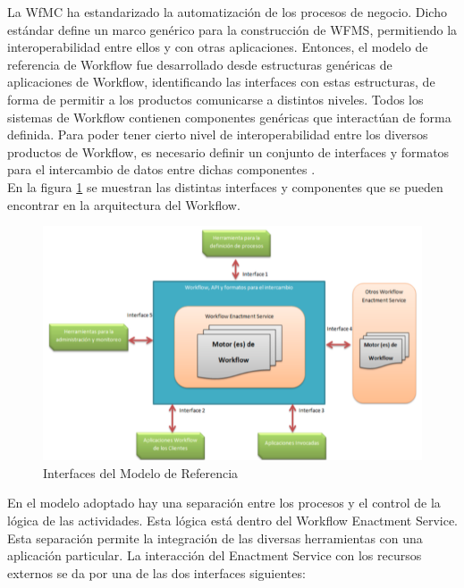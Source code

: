 La WfMC ha estandarizado la automatización de los procesos de negocio. Dicho estándar define un marco genérico para la construcción de WFMS, permitiendo la interoperabilidad entre ellos y con otras aplicaciones. Entonces, el modelo de referencia de Workflow fue desarrollado desde estructuras genéricas de aplicaciones de Workflow, identificando las interfaces con estas estructuras, de forma de permitir a los productos comunicarse a distintos niveles. Todos los sistemas de Workflow contienen componentes genéricas que interactúan de forma definida. Para poder tener cierto nivel de interoperabilidad entre los diversos productos de Workflow, es necesario definir un conjunto de interfaces y formatos para el intercambio de datos entre dichas componentes \cite{WfMC09}.\\
En la figura \ref{fig:Interfaces del Modelo de Referencia} se muestran las distintas interfaces y componentes que se pueden encontrar en la arquitectura del Workflow.

\begin{figure}[!h] 
	\begin{center}
		\includegraphics [scale=0.50]{imagenes/Interfaces_del_Modelo_de_Referencia.png}
	\end{center}
	\caption{Interfaces del Modelo de Referencia}
	\label{fig:Interfaces del Modelo de Referencia}
\end{figure} 

En el modelo adoptado hay una separación entre los procesos y el control de la lógica de las actividades. Esta lógica está dentro del Workflow Enactment Service. Esta separación permite la integración de las diversas herramientas con una aplicación particular. La interacción del Enactment Service con los recursos externos se da por una de las dos interfaces siguientes:

